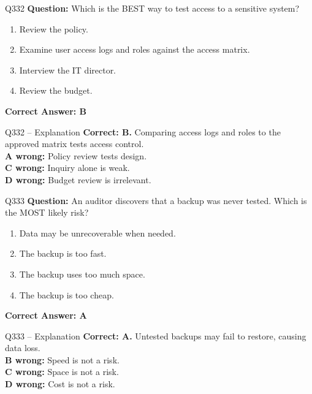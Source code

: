 \documentclass[aspectratio=169,10pt]{beamer}
\begin{document}
	\begin{frame}[t]{Q332}
		\small
		\textbf{Question:} Which is the BEST way to test access to a sensitive system?
		\begin{enumerate}[label=\Alph*.,itemsep=1pt,topsep=2pt]
			\item Review the policy.
			\item Examine user access logs and roles against the access matrix.
			\item Interview the IT director.
			\item Review the budget.
		\end{enumerate}
		\vspace{4pt}
		\textbf{Correct Answer: B}
	\end{frame}
	
	\begin{frame}[t]{Q332 -- Explanation}
		\small
		\textbf{Correct: B.} Comparing access logs and roles to the approved matrix tests access control. \\[4pt]
		\textbf{A wrong:} Policy review tests design. \\[2pt]
		\textbf{C wrong:} Inquiry alone is weak. \\[2pt]
		\textbf{D wrong:} Budget review is irrelevant.
	\end{frame}
	
	\begin{frame}[t]{Q333}
		\small
		\textbf{Question:} An auditor discovers that a backup was never tested. Which is the MOST likely risk?
		\begin{enumerate}[label=\Alph*.,itemsep=1pt,topsep=2pt]
			\item Data may be unrecoverable when needed.
			\item The backup is too fast.
			\item The backup uses too much space.
			\item The backup is too cheap.
		\end{enumerate}
		\vspace{4pt}
		\textbf{Correct Answer: A}
	\end{frame}
	
	\begin{frame}[t]{Q333 -- Explanation}
		\small
		\textbf{Correct: A.} Untested backups may fail to restore, causing data loss. \\[4pt]
		\textbf{B wrong:} Speed is not a risk. \\[2pt]
		\textbf{C wrong:} Space is not a risk. \\[2pt]
		\textbf{D wrong:} Cost is not a risk.
	\end{frame}
	
\end{document}
